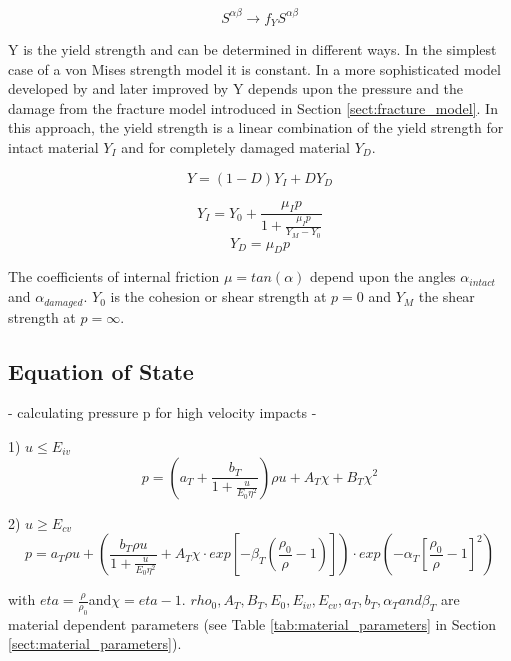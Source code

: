 \begin{equation}
    S^{\alpha \beta} \rightarrow f_Y S^{\alpha \beta}
\end{equation}

Y is the yield strength and can be determined in different ways. In the simplest case of a von Mises strength model it is constant. In a more sophisticated model developed by \cite{Collins_2004} and later improved by \cite{Jutzi_2015} Y depends upon the pressure and the damage from the fracture model introduced in Section \ref{sect:fracture_model}. In this approach, the yield strength is a linear combination of the yield strength for intact material $Y_I$ and for completely damaged material $Y_D$.

\begin{equation}
    Y = \left(1 - D \right)Y_I + DY_D
\end{equation}

\begin{equation}
    Y_I = Y_0 + \frac{\mu_I p}{1 + \frac{\mu_I p}{Y_M - Y_0}}
\end{equation}
\begin{equation}
    Y_D = \mu_D p
\end{equation}

The coefficients of internal friction $\mu = tan(\alpha)$ depend upon the angles $\alpha_{intact}$ and $\alpha_{damaged}$. $Y_0$ is the cohesion or shear strength at $p = 0$ and $Y_M$ the shear strength at $p = \infty$.


\subsection{Equation of State}
- calculating pressure p for high velocity impacts
- \cite{Tillotson_1962}

1) $u \leq E_{iv}$
\begin{equation}
    p = \left(a_T + \frac{b_T}{1 + \frac{u}{E_0\eta^2}}\right)\rho u + A_T \chi + B_T \chi^2
\end{equation}


2) $u \geq E_{cv}$
\begin{equation}
    p = a_T \rho u + \left( \frac{b_T \rho u}{1 + \frac{u}{E_0 \eta^2}} + A_T \chi \cdot exp\left[-\beta_T\left(\frac{\rho_0}{\rho} - 1\right)\right] \right) \cdot exp \left(-\alpha_T \left[\frac{\rho_0}{\rho} - 1 \right]^2 \right)
\end{equation}


with $eta = \frac{\rho}{\rho_0} $and$\chi = eta - 1$. $rho_0, A_T, B_T, E_0, E_{iv}, E_{cv}, a_T, b_T, \alpha_T and \beta_T$ are material dependent parameters (see Table \ref{tab:material_parameters} in Section \ref{sect:material_parameters}).

